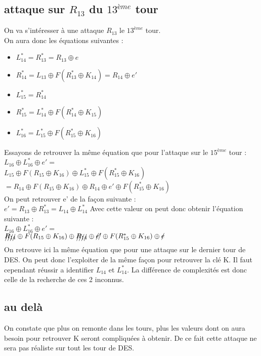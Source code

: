 \documentclass[a4paper,11pt]{article}
\begin{document}
	\subsection{attaque sur $R_{13}$ du $13^{ème}$ tour}
		On va s'intéresser à une attaque $R_{13}$ le $13^{ème}$ tour.\\
	On aura donc les équations suivantes :
	\begin{itemize}
		\item $L_{14}^{*} = R_{13}^{*} = R_{13} \oplus e$
		\item $R_{14}^{*} = L_{13}\oplus F( R_{13}^{*}\oplus K_{14}) = R_{14} \oplus e'$
		\item $L_{15}^{*} =R_{14}^{*}$
		\item $R_{15}^{*} = L_{14}^{*}\oplus F( R_{14}^{*}\oplus K_{15})$
		\item $L_{16}^{*} = L_{15}^{*}\oplus F( R_{15}^{*}\oplus K_{16})$
	\end{itemize}
	Essayons de retrouver la même équation que pour l'attaque sur le $15^{ème}$ tour :\\
	$L_{16} \oplus L_{16}^{*} \oplus e' = $\\ 
	$L_{15}\oplus  F( R_{15}\oplus K_{16})\oplus L_{15}^{*} \oplus F( R_{15}^{*}\oplus K_{16})$\\
	$= R_{14}\oplus  F( R_{15}\oplus K_{16})\oplus  R_{14} \oplus e' \oplus F( R_{15}^{*}\oplus K_{16})$\\
	On peut retrouver e' de la façon suivante :\\
	$e' = R_{13}\oplus R_{13}^{*} = L_{14}\oplus  L_{14}^{*}$
	Avec cette valeur on peut donc obtenir l'équation suivante :\\
	$L_{16} \oplus L_{16}^{*} \oplus e' = $\\ 
	$\xout{R_{14}}\oplus  F( R_{15}\oplus K_{16})\oplus  \xout{R_{14}} \oplus \xout{e'} \oplus F( R_{15}^{*}\oplus K_{16})\oplus \xout{e}$\\
	On retrouve ici la même équation que pour une attaque sur le dernier tour de DES. On peut donc l'exploiter de la même façon pour retrouver la clé K. Il faut cependant réussir a identifier $L_{14}$ et $L_{14}^{*}$. La différence de complexités est donc celle de la recherche de ces 2 inconnus.\\
	\subsection{au delà}
	On constate que plus on remonte dans les tours, plus les valeurs dont on aura besoin pour retrouver K seront compliquées à obtenir. De ce fait cette attaque ne sera pas réaliste sur tout les tour de DES.
\end{document}
